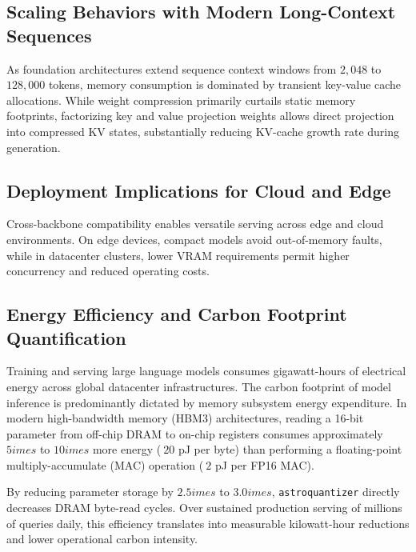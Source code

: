 \subsection{Scaling Behaviors with Modern Long-Context Sequences}
As foundation architectures extend sequence context windows from $2{,}048$ to $128{,}000$ tokens, memory consumption is dominated by transient key-value cache allocations. While weight compression primarily curtails static memory footprints, factorizing key and value projection weights allows direct projection into compressed KV states, substantially reducing KV-cache growth rate during generation.

\subsection{Deployment Implications for Cloud and Edge}
Cross-backbone compatibility enables versatile serving across edge and cloud environments. On edge devices, compact models avoid out-of-memory faults, while in datacenter clusters, lower VRAM requirements permit higher concurrency and reduced operating costs.

\subsection{Energy Efficiency and Carbon Footprint Quantification}
Training and serving large language models consumes gigawatt-hours of electrical energy across global datacenter infrastructures. The carbon footprint of model inference is predominantly dictated by memory subsystem energy expenditure. In modern high-bandwidth memory (HBM3) architectures, reading a 16-bit parameter from off-chip DRAM to on-chip registers consumes approximately $5	imes$ to $10	imes$ more energy ($~20$ pJ per byte) than performing a floating-point multiply-accumulate (MAC) operation ($~2$ pJ per FP16 MAC).

By reducing parameter storage by $2.5	imes$ to $3.0	imes$, \texttt{astroquantizer} directly decreases DRAM byte-read cycles. Over sustained production serving of millions of queries daily, this efficiency translates into measurable kilowatt-hour reductions and lower operational carbon intensity.
